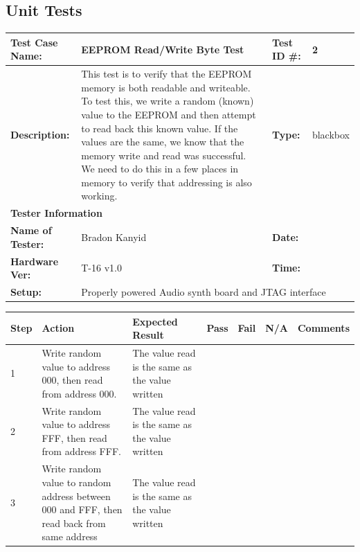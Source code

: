 \documentclass{article}
\begin{document}
\subsection{Unit Tests}
\begin{tabular}{|p{1.3in}|p{3in}|p{.8in}|p{.5in}|}
  \hline
  \textbf{Test Case Name:} & EEPROM Read/Write Byte Test & \textbf{Test ID \#:} & 2\\
  \hline
  \textbf{Description:} &
  This test is to verify that the EEPROM memory is both readable and writeable. To test this, we write a random (known) value to the EEPROM and then attempt to read back this known value. If the values are the same, we know that the memory write and read was successful. We need to do this in a few places in memory to verify that addressing is also working. 
  & \textbf{Type:} & blackbox \\
  \hline
  \multicolumn{4}{|l|}{\textbf{Tester Information}} \\ 
  \hline
  \textbf{Name of Tester:} & Bradon Kanyid & \textbf{Date:} & \\
  \hline
  \textbf{Hardware Ver:} & T-16 v1.0 & \textbf{Time:} & \\
  \hline
  \textbf{Setup:} & \multicolumn{3}{l|}{Properly powered Audio synth board and JTAG interface} \\
  \hline
\end{tabular}
\begin{tabular}{|p{.3in}|p{1in}|p{1.3in}|p{.25in}|p{.25in}|p{.3in}|p{1.7in}|}
  \hline
  \textbf{Step} & \textbf{Action} & \textbf{Expected Result} & \textbf{Pass} & \textbf{Fail} & \textbf{N/A} & \textbf{Comments} \\
  \hline
  1 & Write random value to address 000, then read from address 000. & The value read is the same as the value written & & & &\\
  \hline
  2 & Write random value to address FFF, then read from address FFF. & The value read is the same as the value written & & & &\\
  \hline
  3 & Write random value to random address between 000 and FFF, then read back from same address & The value read is the same as the value written & & & &\\
  \hline
\end{tabular}
\end{document}
